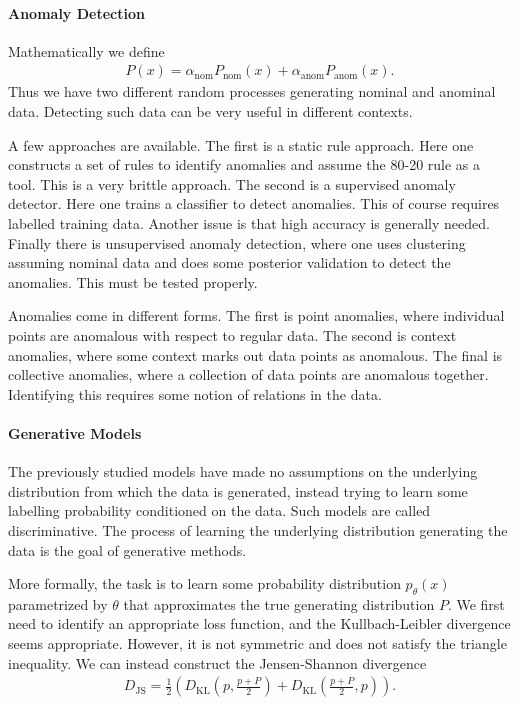 \paragraph{Anomaly Detection}
Mathematically we define
\begin{align*}
	P(x) = \alpha_{\text{nom}}P_{\text{nom}}(x) + \alpha_{\text{anom}}P_{\text{anom}}(x).
\end{align*}
Thus we have two different random processes generating nominal and anominal data. Detecting such data can be very useful in different contexts.

A few approaches are available. The first is a static rule approach. Here one constructs a set of rules to identify anomalies and assume the 80-20 rule as a tool.  This is a very brittle approach. The second is a supervised anomaly detector. Here one trains a classifier to detect anomalies. This of course requires labelled training data. Another issue is that high accuracy is generally needed. Finally there is unsupervised anomaly detection, where one uses clustering assuming nominal data and does some posterior validation to detect the anomalies. This must be tested properly.

Anomalies come in different forms. The first is point anomalies, where individual points are anomalous with respect to regular data. The second is context anomalies, where some context marks out data points as anomalous. The final is collective anomalies, where a collection of data points are anomalous together. Identifying this requires some notion of relations in the data. 

\paragraph{Generative Models}
The previously studied models have made no assumptions on the underlying distribution from which the data is generated, instead trying to learn some labelling probability conditioned on the data. Such models are called discriminative. The process of learning the underlying distribution generating the data is the goal of generative methods.

More formally, the task is to learn some probability distribution $p_{\theta}(x)$ parametrized by $\theta$ that approximates the true generating distribution $P$. We first need to identify an appropriate loss function, and the Kullbach-Leibler divergence seems appropriate. However, it is not symmetric and does not satisfy the triangle inequality. We can instead construct the Jensen-Shannon divergence
\begin{align*}
	D_{\text{JS}} = \frac{1}{2}\left(D_{\text{KL}}\left(p, \frac{p + P}{2}\right) + D_{\text{KL}}\left(\frac{p + P}{2}, p\right)\right).
\end{align*}

